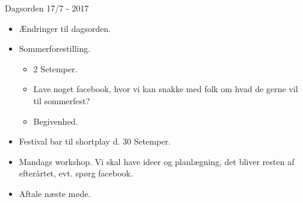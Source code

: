 \documentclass[12pt, a4paper]{article}
\begin{document}
\begin{center}
  {\LARGE Dagsorden 17/7 - 2017}
\end{center}

\begin{itemize}
  \item Ændringer til dagsorden.
  \item Sommerforestilling.
  \begin{itemize}
    \item 2 Setemper.
    \item Lave noget facebook, hvor vi kan snakke med folk om hvad de gerne vil til sommerfest?
    \item Begivenhed.
  \end{itemize}
  \item Festival bar til shortplay d. 30 Setemper.
  \item Mandags workshop. Vi skal have ideer og planlægning, det bliver resten af efterårtet, evt. spørg facebook.
  \item Aftale næste møde.
\end{itemize}
\end{document}
